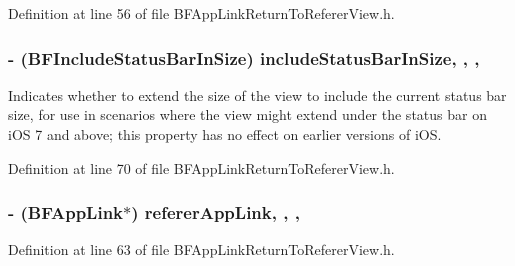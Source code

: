 Definition at line 56 of file B\+F\+App\+Link\+Return\+To\+Referer\+View.\+h.

\hypertarget{interface_b_f_app_link_return_to_referer_view_a640b53f5c49f1bfb5f11a81a8f7381af}{}
\subsubsection[{include\+Status\+Bar\+In\+Size}]{\setlength{\rightskip}{0pt plus 5cm}-\/ ({\bf B\+F\+Include\+Status\+Bar\+In\+Size}) include\+Status\+Bar\+In\+Size\hspace{0.3cm}{\ttfamily [read]}, {\ttfamily [write]}, {\ttfamily [nonatomic]}, {\ttfamily [assign]}}\label{interface_b_f_app_link_return_to_referer_view_a640b53f5c49f1bfb5f11a81a8f7381af}
Indicates whether to extend the size of the view to include the current status bar size, for use in scenarios where the view might extend under the status bar on i\+O\+S 7 and above; this property has no effect on earlier versions of i\+O\+S. 

Definition at line 70 of file B\+F\+App\+Link\+Return\+To\+Referer\+View.\+h.

\hypertarget{interface_b_f_app_link_return_to_referer_view_ab4a55f394888bd423c01532a9c6dafef}{}
\subsubsection[{referer\+App\+Link}]{\setlength{\rightskip}{0pt plus 5cm}-\/ ({\bf B\+F\+App\+Link}$\ast$) referer\+App\+Link\hspace{0.3cm}{\ttfamily [read]}, {\ttfamily [write]}, {\ttfamily [nonatomic]}, {\ttfamily [strong]}}\label{interface_b_f_app_link_return_to_referer_view_ab4a55f394888bd423c01532a9c6dafef}


Definition at line 63 of file B\+F\+App\+Link\+Return\+To\+Referer\+View.\+h.

\hypertarget{interface_b_f_app_link_return_to_referer_view_acef579105c567f8f22a2604ea388a37b}{}
